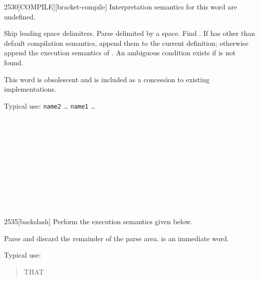 \pagebreak
\begin{worddef}{2530}{[COMPILE]}[bracket-compile]
\interpret
	Interpretation semantics for this word are undefined.

\compile

	Skip leading space delimiters. Parse  delimited by
	a space. Find . If  has other than default
	compilation semantics, append them to the current definition;
	otherwise append the execution semantics of . An
	ambiguous condition exists if  is not found.

\note This word is obsolescent and is included as a concession to
	existing implementations.


	\begin{rationale} %
		Typical use:
			\word{:} \texttt{name2} {\ldots}
				\word{[COMPILE]} \texttt{name1}
			{\ldots} \word{;} ~ 
	\end{rationale}

	\begin{testing}
		 \\
		 \\

		 \\
		\test{\word{:} [c2] \word{[COMPILE]} [c1] \word{;}}{} \\

		 \\
		 \\
		 \\
		 \\
	\end{testing}
\end{worddef}


\begin{worddef}[bs]{2535}{\bs}[backslash]
\compile
	Perform the execution semantics given below.

\execute

	Parse and discard the remainder of the parse area.
	 is an immediate word.


	\begin{rationale} %
		Typical use:
		\begin{quote}  THAT
			~  ~ 
		\end{quote}
	\end{rationale}
\end{worddef}

\endinput